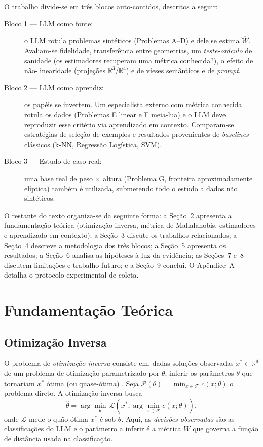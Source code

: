 \documentclass[12pt,a4paper]{article}
\newcommand{\West}{\ensuremath{\hat{W}}}   %
\begin{document}
O trabalho divide-se em três blocos auto-contidos, descritos a seguir:

\begin{description}
  \item[Bloco 1 — LLM como fonte:] o LLM rotula problemas sintéticos (Problemas A–D) e
    dele se estima \West{}. Avaliam-se fidelidade, transferência entre geometrias, um
    \emph{teste-oráculo} de sanidade (os estimadores recuperam uma métrica conhecida?),
    o efeito de não-linearidade (projeções $\mathbb{R}^3$/$\mathbb{R}^4$) e de vieses
    semânticos e de \emph{prompt}.
  \item[Bloco 2 — LLM como aprendiz:] os papéis se invertem. Um especialista externo com
    métrica conhecida rotula os dados (Problemas E linear e F meia-lua) e o LLM deve
    reproduzir esse critério via aprendizado em contexto. Comparam-se estratégias de
    seleção de exemplos e resultados provenientes de \emph{baselines} clássicos
    (k-NN, Regressão Logística, SVM).
  \item[Bloco 3 — Estudo de caso real:] uma base real de peso $\times$ altura (Problema G,
    fronteira aproximadamente elíptica) também é utilizada, submetendo todo o estudo a
    dados não sintéticos.
\end{description}

O restante do texto organiza-se da seguinte forma: a Seção~2
apresenta a fundamentação teórica (otimização inversa, métrica de Mahalanobis, estimadores
e aprendizado em contexto); a Seção~3 discute os trabalhos
relacionados; a Seção~4 descreve a metodologia dos três blocos; a
Seção~5 apresenta os resultados; a Seção~6 analisa as
hipóteses à luz da evidência; as Seções~7 e~8 discutem
limitações e trabalho futuro; e a Seção~9 conclui. O
Apêndice~A detalha o protocolo experimental de coleta.

\section{Fundamentação Teórica}
\label{sec:fundamentos}

\subsection{Otimização Inversa}

O problema de \emph{otimização inversa} consiste em, dadas soluções observadas
$x^* \in \mathbb{R}^d$ de um problema de otimização parametrizado por $\theta$, inferir os
parâmetros $\theta$ que tornariam $x^*$ ótima (ou quase-ótima) \cite{chanInverseOptimization2025}.
Seja $\mathcal{P}(\theta) = \min_{x \in \mathcal{F}} c(x; \theta)$ o problema direto. A
otimização inversa busca
\begin{equation}
  \hat{\theta} = \arg\min_{\theta} \,
  \mathcal{L}\!\left(x^*, \arg\min_{x \in \mathcal{F}} c(x; \theta)\right),
\end{equation}
onde $\mathcal{L}$ mede o quão ótima $x^*$ é sob $\theta$. Aqui, as \emph{decisões
observadas} são as classificações do LLM e o parâmetro a inferir é a métrica $W$ que governa
a função de distância usada na classificação.
\end{document}
